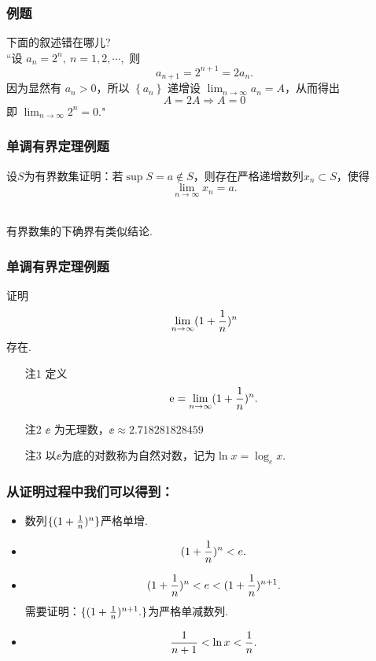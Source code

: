 \documentclass[mathserif]{beamer}
\begin{document}
\begin{frame}
	\frametitle{例题}
		\begin{ex}
		\suojin 下面的叙述错在哪儿?\\
	\suojin “设 $a_n=2^n,\ n=1,2, \cdots$,\ 则
	$$
	a_{n+1}=2^{n+1}=2 a_n .
	$$
	因为显然有 $a_n>0$，所以 $\left\{a_n\right\}$ 递增\jh 设 $\lim _{n \rightarrow \infty} a_n=A$，从而得出
	$$
	A=2 A \Rightarrow A=0
	$$
	即 $\lim _{n \rightarrow \infty} 2^n=0$."
\end{ex}
\end{frame}


\begin{frame}[label=qjsl]
\frametitle{单调有界定理例题}
\begin{prop}
\suojin 设$S$为有界数集\jh 证明：若$\sup S=a\notin S$，则存在严格递增数列$x_{n}\subset S$，使得
$$\lim_{n\rightarrow\infty}x_n =a.$$
\end{prop}
\hfill\hyperlink{qjslzm<1>}{}\\
 \suojin 有界数集的下确界有类似结论.
\end{frame}






\begin{frame}[label=li_4]
\frametitle{单调有界定理例题}  
\begin{ex}[4]
\suojin 证明$$\lim_{n\rightarrow\infty}(1+\frac{1}{n}) ^{n}$$
存在.
\end{ex}
\hfill\hyperlink{li_4jd<1>}{}
\begin{itemize}
\item[注1\jh] 定义$$\textnormal{e}=\lim_{n\rightarrow\infty}(1+\frac{1}{n})^{n}.$$
\item[注2\jh] $\ee$ 为无理数，$\ee\approx 2.718281828459$\jh
\item[注3\jh] 以$\ee$为底的对数称为自然对数，记为$\ln x=\log_{e}x$.
\end{itemize}
\end{frame}



\begin{frame}
\frametitle{从证明过程中我们可以得到：}
\begin{itemize}
\item \suojin\suojin\suojin 数列$\{(1+\frac{1}{n})^{n}\}$严格单增.
\item $$(1+\frac{1}{n})^{n}<e.$$
\item $$(1+\frac{1}{n})^{n}<e<(1+\frac{1}{n})^{n+1}.$$
需要证明：$\{(1+\frac{1}{n})^{n+1}.\}$为严格单减数列.
\item $$\frac{1}{n+1}<\ln x<\frac{1}{n}.$$
\end{itemize}
\end{frame}
\end{document}
